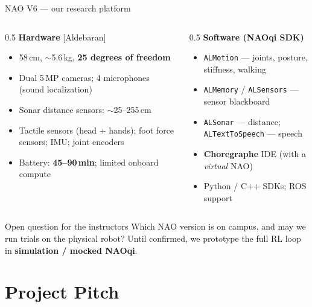 \documentclass[aspectratio=169,10pt]{beamer}
\newcommand{\refnum}[1]{{\footnotesize\color{giuaccent}[#1]}}
\begin{document}
\begin{frame}{NAO V6 --- our research platform}
  \begin{columns}[T]
    \begin{column}{0.5\textwidth}
      \textbf{Hardware} \refnum{Aldebaran}
      \begin{itemize}\footnotesize
        \item 58\,cm, $\sim$5.6\,kg, \textbf{25 degrees of freedom}
        \item Dual 5\,MP cameras; 4 microphones (sound localization)
        \item \alert{Sonar} distance sensors: $\sim$25--255\,cm
        \item \alert{Tactile} sensors (head + hands); foot force sensors; IMU; joint encoders
        \item Battery: \textbf{45--90\,min}; limited onboard compute
      \end{itemize}
    \end{column}
    \begin{column}{0.5\textwidth}
      \textbf{Software (NAOqi SDK)}
      \begin{itemize}\footnotesize
        \item \texttt{ALMotion} --- joints, posture, stiffness, walking
        \item \texttt{ALMemory} / \texttt{ALSensors} --- sensor blackboard
        \item \texttt{ALSonar} --- distance; \texttt{ALTextToSpeech} --- speech
        \item \textbf{Choregraphe} IDE (with a \emph{virtual} NAO)
        \item Python / C++ SDKs; ROS support
      \end{itemize}
    \end{column}
  \end{columns}
  \vspace{0.4em}
  \begin{alertblock}{Open question for the instructors}
    Which NAO version is on campus, and may we run trials on the physical robot? Until confirmed, we prototype the full RL loop in \textbf{simulation / mocked NAOqi}.
  \end{alertblock}
\end{frame}

\section{Project Pitch}
\end{document}
